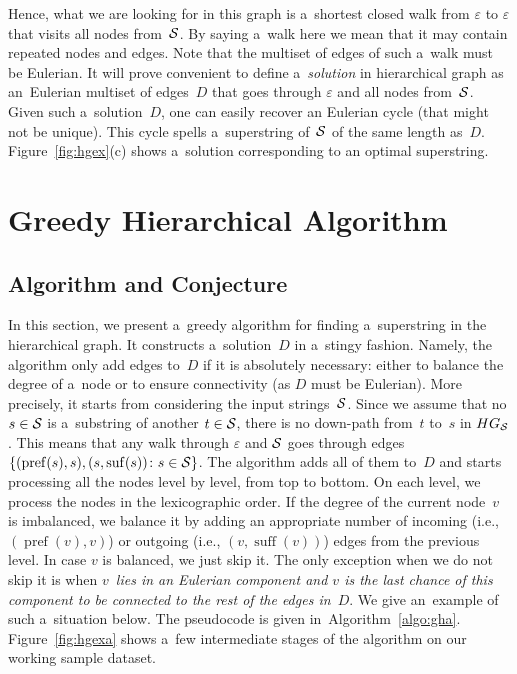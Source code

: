 \documentclass[11pt]{article}
\DeclareMathOperator{\pref}{pref}
\DeclareMathOperator{\suff}{suff}
\begin{document}
Hence, what we are looking for in this graph is a~shortest closed walk from $\varepsilon$ to $\varepsilon$ that visits all nodes from~${\cal S}$. By saying a~walk here we mean that it may contain repeated nodes and edges. Note that the multiset of edges of such a~walk must be Eulerian. It will prove convenient to define a~{\em solution} in hierarchical graph as an~Eulerian multiset of edges~$D$ that goes through $\varepsilon$ and all nodes from~${\cal S}$. Given such a~solution~$D$, one can easily recover an Eulerian cycle (that might not be unique). This cycle spells a~superstring of~${\cal S}$ of the same length as~$D$. Figure~\ref{fig:hgex}(c) shows a~solution corresponding to an optimal superstring.

\section{Greedy Hierarchical Algorithm}
\subsection{Algorithm and Conjecture}
In this section, we present a~greedy algorithm for
finding a~superstring in the hierarchical graph. 
It constructs a~solution~$D$ in a~stingy fashion. 
Namely, the algorithm only add edges to~$D$ 
if it is absolutely necessary: either to balance the degree of a~node or to ensure connectivity 
(as $D$ must be Eulerian). 
More precisely, it starts from considering the input
strings~${\cal S}$. Since we assume that 
no $s \in {\cal S}$ is a~substring of another 
$t \in {\cal S}$, there is no down-path from~$t$ to~$s$ in $HG_{\cal S}$. 
This means that any walk through $\varepsilon$ and ${\cal S}$ goes through edges $\{(\operatorname{pref}(s), s), (s, \operatorname{suf}(s)) \colon s \in {\cal S}\}$. The algorithm adds all of them to~$D$ and starts processing all the nodes level by level, from top to bottom. On each level, we process the nodes in the lexicographic order. If the degree of the current node~$v$ is imbalanced, we balance it by adding an appropriate number of incoming (i.e., $(\pref(v),v)$) or outgoing (i.e., $(v, \suff(v))$) edges from the previous level. In case $v$ is balanced, we just skip it. The only exception when we do not skip it is when {\em $v$~lies in an Eulerian component and $v$ is the last chance of this component to be connected to the rest of the edges in~$D$}. We give an~example of such a~situation below. The pseudocode is given in~Algorithm~\ref{algo:gha}. Figure~\ref{fig:hgexa} shows a~few intermediate stages of the algorithm on our working sample dataset.
\end{document}
